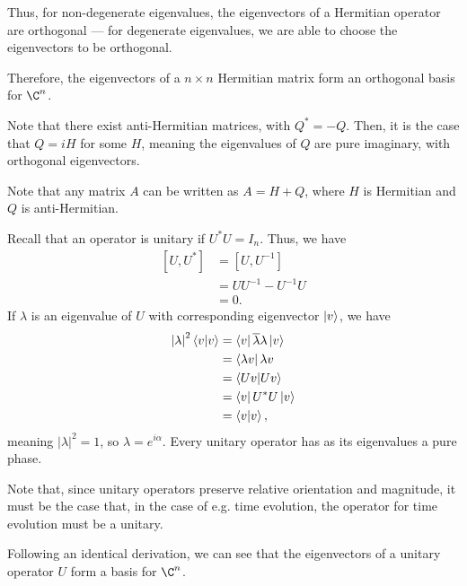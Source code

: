 \documentclass[10pt]{mypackage}
\begin{document}
\begin{example}
  Thus, for non-degenerate eigenvalues, the eigenvectors of a Hermitian operator are orthogonal --- for degenerate eigenvalues, we are able to choose the eigenvectors to be orthogonal.\newline

  Therefore, the eigenvectors of a $n\times n$ Hermitian matrix form an orthogonal basis for $\C^n$.\newline

  Note that there exist anti-Hermitian matrices, with $Q^{\ast} = -Q$. Then, it is the case that $Q = iH$ for some $H$, meaning the eigenvalues of $Q$ are pure imaginary, with orthogonal eigenvectors.\newline

  Note that any matrix $A$ can be written as $A = H + Q$, where $H$ is Hermitian and $Q$ is anti-Hermitian.
\end{example}
\begin{example}
  Recall that an operator is unitary if $U^{\ast}U = I_{n}$. Thus, we have
  \begin{align*}
    \left[U,U^{\ast}\right] &= \left[U,U^{-1}\right]\\
                            &= UU^{-1} - U^{-1}U\\
                            &= 0.
  \end{align*}
  If $\lambda$ is an eigenvalue of $U$ with corresponding eigenvector $\ket{v}$, we have
  \begin{align*}
    \left\vert \lambda \right\vert^2\braket{v}{v} &= \bra{v}\overline{\lambda} \lambda\ket{v}\\
                                                  &= \bra{\lambda v}{\lambda v}\\
                                                  &= \braket{Uv}{Uv}\\
                                                  &= \bra{v}U^{\ast}U\ket{v}\\
                                                  &= \braket{v}{v},
  \end{align*}
  meaning $\left\vert \lambda \right\vert^2 = 1$, so $\lambda = e^{i\alpha}$. Every unitary operator has as its eigenvalues a pure phase.\newline

  Note that, since unitary operators preserve relative orientation and magnitude, it must be the case that, in the case of e.g. time evolution, the operator for time evolution must be a unitary.\newline

  Following an identical derivation, we can see that the eigenvectors of a unitary operator $U$ form a basis for $\C^n$.
\end{example}
\end{document}
